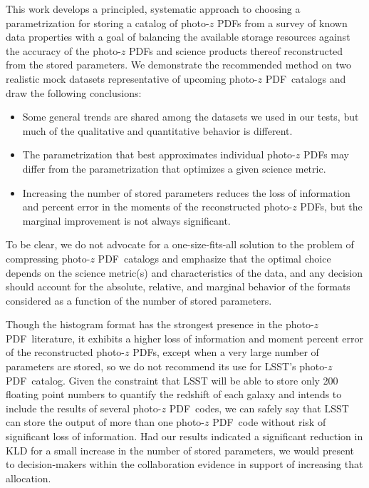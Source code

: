 \documentclass[\docopts]{\docclass}
\newcommand{\pz}{photo-$z$ PDF}
\begin{document}
This work develops a principled, systematic approach to choosing a 
parametrization for storing a catalog of \pz s from a survey of known data 
properties with a goal of balancing the available storage resources against the 
accuracy of the \pz s and science products thereof reconstructed from the 
stored parameters.
We demonstrate the recommended method on two realistic mock datasets 
representative of upcoming \pz\ catalogs and draw the following conclusions:
\begin{itemize}
  \item Some general trends are shared among the datasets we used in our tests, 
but much of the qualitative and quantitative behavior is different.
  \item The parametrization that best approximates individual \pz s may differ 
from the parametrization that optimizes a given science metric.
  \item Increasing the number of stored parameters reduces the loss of 
information and percent error in the moments of the reconstructed \pz s, but 
the marginal improvement is not always significant.
\end{itemize}
To be clear, we do not advocate for a one-size-fits-all solution to the problem 
of compressing \pz\ catalogs and emphasize that the optimal choice depends on 
the science metric(s) and characteristics of the data, and any decision should 
account for the absolute, relative, and marginal behavior of the formats 
considered as a function of the number of stored parameters.

Though the histogram format has the strongest presence in the \pz\ literature, 
it exhibits a higher loss of information and moment percent error of the 
reconstructed \pz s, except when a very large number of parameters are stored, 
so we do not recommend its use for LSST's \pz\ catalog.
Given the constraint that LSST will be able to store only 200 floating point 
numbers to quantify the redshift of each galaxy and intends to include the 
results of several \pz\ codes, we can safely say that LSST can store the output 
of more than one \pz\ code without risk of significant loss of information.
Had our results indicated a significant reduction in KLD for a small increase 
in the number of stored parameters, we would present to decision-makers within 
the collaboration evidence in support of increasing that allocation.
\end{document}
